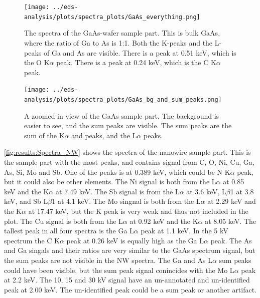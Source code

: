 \begin{figure}[p] %
    \centering
    \texttt{[image: ../eds-analysis/plots/spectra\_plots/GaAs\_everything.png]}
    \caption{
        The spectra of the GaAs-wafer sample part.
        This is bulk GaAs, where the ratio of Ga to As is 1:1.
        Both the K-peaks and the L-peaks of Ga and As are visible.
        There is a peak at 0.51 keV, which is the O K$\alpha$ peak.
        There is a peak at 0.24 keV, which is the C K$\alpha$ peak.
    }
    \label{fig:results:Spectra_GaAs}
\end{figure}


\begin{figure}[p]
    \centering
    \texttt{[image: ../eds-analysis/plots/spectra\_plots/GaAs\_bg\_and\_sum\_peaks.png]}
    \caption{
        A zoomed in view of the GaAs sample part.
        The background is easier to see, and the sum peaks are visible.
        The sum peaks are the sum of the K$\alpha$ and peaks, and the L$\alpha$ peaks.
    }
    \label{fig:results:Spectra_GaAs_bg_and_sum_peaks}
\end{figure}


\cref{fig:results:Spectra_NW} shows the spectra of the nanowire sample part.
This is the sample part with the most peaks, and contains signal from C, O, Ni, Cu, Ga, As, Si, Mo and Sb.
One of the peaks is at 0.389 keV, which could be N K$\alpha$ peak, but it could also be other elements. %
The Ni signal is both from the L$\alpha$ at 0.85 keV and the K$\alpha$ at 7.49 keV.
The Sb signal is from the L$\alpha$ at 3.6 keV, L$\beta$1 at 3.8 keV, and Sb L$\beta$1 at 4.1 keV. %
The Mo singnal is both from the L$\alpha$ at 2.29 keV and the K$\alpha$ at 17.47 keV, but the K peak is very weak and thus not included in the plot.
The Cu signal is both from the L$\alpha$ at 0.92 keV and the K$\alpha$ at 8.05 keV.
The tallest peak in all four spectra is the Ga L$\alpha$ peak at 1.1 keV.
In the 5 kV spectrum the C K$\alpha$ peak at 0.26 keV is equally high as the Ga L$\alpha$ peak.
The As and Ga singals and their ratios are very similar to the GaAs spectrum signal, but the sum peaks are not visible in the NW spectra.
The Ga and As L$\alpha$ sum peaks could have been visible, but the sum peak signal conincides with the Mo L$\alpha$ peak at 2.2 keV. %
The 10, 15 and 30 kV signal have an un-annotated and un-identified peak at 2.00 keV.
The un-identified peak could be a sum peak or another artifact.

